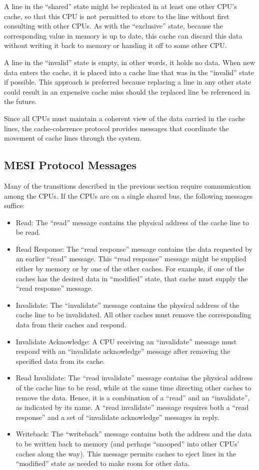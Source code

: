 A line in the ``shared'' state might be replicated in at least
one other CPU's cache, so that this CPU is not permitted to store
to the line without first consulting with other CPUs.
As with the ``exclusive'' state, because the corresponding value
in memory is up to date,
this cache can discard this data without writing it back to memory
or handing it off to some other CPU.

A line in the ``invalid'' state is empty, in other words, it holds
no data.
When new data enters the cache, it is placed into a
cache line that was in the ``invalid'' state if possible.
This approach is preferred because replacing a line in any other
state could result in an expensive cache miss should the replaced
line be referenced in the future.

Since all CPUs must maintain a coherent view of the data carried in
the cache lines, the cache-coherence protocol provides messages
that coordinate the movement of cache lines through the system.

\subsection{MESI Protocol Messages}
\label{sec:app:whymb:MESI Protocol Messages}

Many of the transitions described in the previous section require
communication among the CPUs.
If the CPUs are on a single shared bus, the following messages suffice:
\begin{itemize}
\item	Read:
	The ``read'' message contains the physical address of the cache line
	to be read.
\item	Read Response:
	The ``read response'' message contains the data requested by an
	earlier ``read'' message.
	This ``read response'' message might be supplied either by
	memory or by one of the other caches.
	For example, if one of the caches has the desired data in
	``modified'' state, that cache must supply the ``read response''
	message.
\item	Invalidate:
	The ``invalidate'' message contains the physical address of the
	cache line to be invalidated.
	All other caches must remove the corresponding data from their
	caches and respond.
\item	Invalidate Acknowledge:
	A CPU receiving an ``invalidate'' message must respond with an
	``invalidate acknowledge'' message after removing the specified
	data from its cache.
\item	Read Invalidate:
	The ``read invalidate'' message contains the physical address
	of the cache line to be read, while at the same time directing
	other caches to remove the data.
	Hence, it is a combination of a ``read'' and an ``invalidate'',
	as indicated by its name.
	A ``read invalidate'' message requires both a ``read response''
	and a set of ``invalidate acknowledge'' messages in reply.
\item	Writeback:
	The ``writeback'' message contains both the address and the
	data to be written back to memory (and perhaps ``snooped''
	into other CPUs' caches along the way).
	This message permits caches to eject lines in the ``modified''
	state as needed to make room for other data.
\end{itemize}

